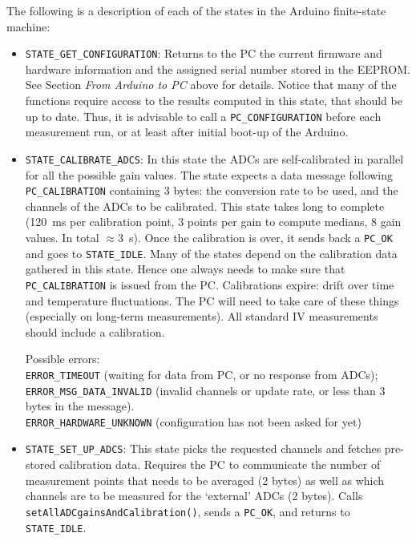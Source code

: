 \documentclass[11pt,a4paper,english]{article}
\begin{document}
\vspace*{\baselineskip}
\noindent{}The following is a description of each of the states in the Arduino finite-state machine:
\begin{itemize}
\item \texttt{STATE\_GET\_CONFIGURATION}: Returns to the PC the current firmware and hardware information and the assigned serial number stored in the EEPROM. See Section \textit{From Arduino to PC} above for details. Notice that many of the functions require access to the results computed in this state, that should be up to date. Thus, it is advisable to call a \texttt{PC\_CONFIGURATION} before each measurement run, or at least after initial boot-up of the Arduino.

\item \texttt{STATE\_CALIBRATE\_ADCS}: In this state the ADCs are self-calibrated in parallel for all the possible gain values. The state expects a data message following \texttt{PC\_CALIBRATION} containing 3 bytes: the conversion rate to be used, and the channels of the ADCs to be calibrated. This state takes long to complete (120~ms per calibration point, 3 points per gain to compute medians, 8 gain values. In total $\approx3$~s). Once the calibration is over, it sends back a \texttt{PC\_OK} and goes to \texttt{STATE\_IDLE}. Many of the states depend on the calibration data gathered in this state. Hence one always needs to make sure that \texttt{PC\_CALIBRATION} is issued from the PC. Calibrations expire: drift over time and temperature fluctuations. The PC will need to take care of these things (especially on long-term measurements). All standard IV measurements should include a calibration.

    Possible errors:\\\texttt{ERROR\_TIMEOUT} (waiting for data from PC, or no response from ADCs);\\\texttt{ERROR\_MSG\_DATA\_INVALID} (invalid channels or update rate, or less than 3 bytes in the message).\\\texttt{ERROR\_HARDWARE\_UNKNOWN} (configuration has not been asked for yet)

\item \texttt{STATE\_SET\_UP\_ADCS}: This state picks the requested channels and fetches pre-stored calibration data. Requires the PC to communicate the number of measurement points that needs to be averaged (2 bytes) as well as which channels are to be measured for the `external' ADCs (2 bytes). Calls \texttt{setAllADCgainsAndCalibration()}, sends a \texttt{PC\_OK}, and returns to \texttt{STATE\_IDLE}.


\end{itemize}
\end{document}
